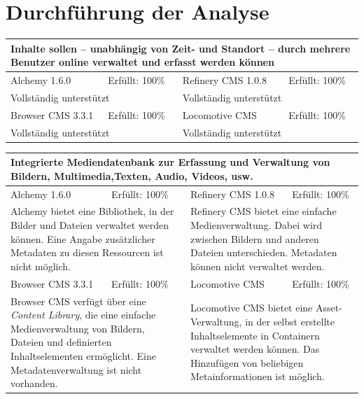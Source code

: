 \section{Durchführung der Analyse}
\begin{tabular}[!ht]{|l|l|l|l|}
\hline
\multicolumn{4}{|p{15cm}|}{\textbf{Inhalte sollen – unabhängig von Zeit- und Standort – durch mehrere Benutzer online verwaltet und erfasst werden können}} \\
\hline
  Alchemy 1.6.0 & \cellcolor{green}Erfüllt: 100\% & Refinery CMS 1.0.8 & \cellcolor{green}Erfüllt: 100\% \\
  \hline
  \multicolumn{2}{|p{7.5cm}|}{Vollständig unterstützt} & \multicolumn{2}{p{7.5cm}|}{Vollständig unterstützt} \\
  \hline
  Browser CMS 3.3.1 & \cellcolor{green}Erfüllt: 100\% & Locomotive CMS & \cellcolor{green}Erfüllt: 100\% \\
  \hline
  \multicolumn{2}{|p{7.5cm}|}{Vollständig unterstützt} & \multicolumn{2}{p{7.5cm}|}{Vollständig unterstützt} \\
\hline
\end{tabular}
\newline
\newline
\newline
\begin{tabular}[!ht]{|l|l|l|l|}
\hline
\multicolumn{4}{|p{15cm}|}{\textbf{Integrierte Mediendatenbank zur Erfassung und Verwaltung von Bildern, Multimedia,Texten, Audio, Videos, usw.}} \\
\hline
  Alchemy 1.6.0 & \cellcolor{green}Erfüllt: 100\% & Refinery CMS 1.0.8 & \cellcolor{green}Erfüllt: 100\% \\
  \hline
  \multicolumn{2}{|p{7.5cm}|}{Alchemy bietet eine Bibliothek, in der Bilder und Dateien verwaltet werden können. Eine Angabe zusätzlicher Metadaten zu diesen Ressourcen ist nicht möglich.}
   & \multicolumn{2}{p{7.5cm}|}{Refinery CMS bietet eine einfache Medienverwaltung. Dabei wird zwischen Bildern und anderen Dateien unterschieden. Metadaten können nicht verwaltet werden.} \\
  \hline
  Browser CMS 3.3.1 & \cellcolor{green}Erfüllt: 100\% & Locomotive CMS & \cellcolor{green}Erfüllt: 100\% \\
  \hline
  \multicolumn{2}{|p{7.5cm}|}{Browser CMS verfügt über eine \emph {Content Library}, die eine einfache Medienverwaltung von Bildern, Dateien und definierten Inhaltselementen ermöglicht. Eine Metadatenverwaltung ist nicht vorhanden.} & \multicolumn{2}{p{7.5cm}|}{Locomotive CMS bietet eine Asset-Verwaltung, in der selbst erstellte Inhaltselemente in Containern verwaltet werden können. Das Hinzufügen von beliebigen Metainformationen ist möglich.} \\
\hline
\end{tabular}
